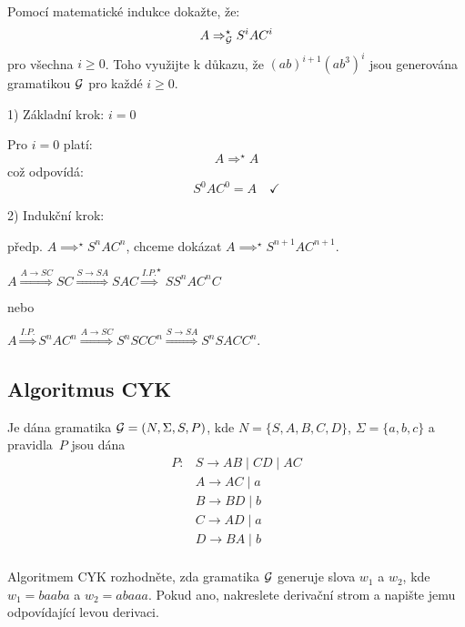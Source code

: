 Pomocí matematické indukce dokažte, že:
\[
A \Rightarrow_{\mathcal{G}}^{\star} S^i A C^i
\]
pro všechna $i \geq 0$. Toho využijte k důkazu, že $(ab)^{i+1}(ab^3)^i$ jsou generována gramatikou $\mathcal{G}$ pro 
každé $i \geq 0$.

1) Základní krok: $i = 0$

Pro $i = 0$ platí:
\[
A {\Longrightarrow^\star} A
\]
což odpovídá:
\[
S^0 A C^0 = A \quad \checkmark
\]

2) Indukční krok:

předp. $A {\implies^\star} S^n A C^n$, chceme dokázat $A \implies^{\star} S^{n+1} A C^{n+1}$.

$A \stackrel{A \rightarrow SC}{\Longrightarrow} SC \stackrel{S \rightarrow SA}{\Longrightarrow} SAC \stackrel{I.P.}
{\Longrightarrow}^{\star} SS^nAC^nC$

nebo

$A \stackrel{I.P.}{\Longrightarrow} S^n A C^n \stackrel{A \rightarrow SC}{\Longrightarrow} S^nSCC^n \stackrel
{S \rightarrow SA}{\Longrightarrow} S^nSACC^n$.

\newpage
\subsection{Algoritmus CYK} %
Je dána gramatika $\mathcal{G} = (N, \Sigma, S, P )$, kde $N = \{S, A, B, C, D\}$, $\Sigma = \{a, b, c\}$ a
pravidla~$P$ jsou dána
\begin{align*}
    P: & S \rightarrow AB \mid CD \mid AC\\
    & A \rightarrow AC \mid a \\
    & B \rightarrow BD \mid b \\
    & C \rightarrow AD \mid a \\
    & D \rightarrow BA \mid b \\ 
\end{align*}

Algoritmem CYK rozhodněte, zda gramatika $\mathcal{G}$ generuje slova $w_1$ a $w_2$, kde $w_1 = baaba$ a $w_2 = abaaa$.
Pokud ano, nakreslete derivační strom a napište jemu odpovídající levou derivaci.

